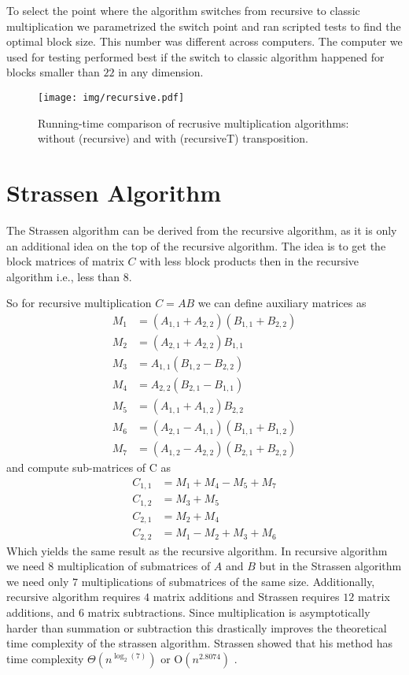 \documentclass[a4paper,11pt]{article}
\begin{document}
To select the point where the algorithm switches from recursive to classic multiplication we parametrized the switch point and ran scripted tests to find the optimal block size. This number was different across computers. The computer we used for testing performed best if the switch to classic algorithm happened for blocks smaller than $22$ in any dimension.

\begin{figure}[h]
\centering
\texttt{[image: img/recursive.pdf]}
\caption{Running-time comparison of recrusive multiplication algorithms: without (\textsf{recursive}) and with (\textsf{recursiveT}) transposition.}
\label{fig:recursive}
\end{figure}



\section{Strassen Algorithm}
\label{section:strassen}

The Strassen algorithm can be derived from the recursive algorithm, as it is only an additional idea on the top of the recursive algorithm.
The idea is to get the block matrices of matrix $C$ with less block products then in the recursive algorithm i.e., less than 8.

So for recursive multiplication $C=AB$ we can define auxiliary matrices as 
\begin{align*}
M_{1} &= (A_{1,1} + A_{2,2})(B_{1,1} + B_{2,2}) \\
M_{2} &= (A_{2,1} + A_{2,2})B_{1,1} \\
M_{3} &= A_{1,1}(B_{1,2} - B_{2,2}) \\
M_{4} &= A_{2,2}(B_{2,1} - B_{1,1}) \\
M_{5} &= (A_{1,1} + A_{1,2})B_{2,2} \\
M_{6} &= (A_{2,1} - A_{1,1})(B_{1,1} + B_{1,2}) \\
M_{7} &= (A_{1,2} - A_{2,2})(B_{2,1} + B_{2,2})
\end{align*}
and compute sub-matrices of C as
\begin{align*}
C_{1,1} &= M_{1} + M_{4} - M_{5} + M_{7} \\
C_{1,2} &= M_{3} + M_{5} \\
C_{2,1} &= M_{2} + M_{4} \\
C_{2,2} &= M_{1} - M_{2} + M_{3} + M_{6}
\end{align*}
Which yields the same result as the recursive algorithm.
In recursive algorithm we need $8$ multiplication of submatrices of $A$ and $B$ but in the Strassen algorithm we need only $7$ multiplications of submatrices of the same size. Additionally, recursive algorithm requires $4$ matrix additions and Strassen requires $12$ matrix additions, and $6$ matrix subtractions. Since multiplication is asymptotically harder than summation or subtraction this drastically improves the theoretical time complexity of the strassen algorithm. Strassen showed that his method has time complexity
$\Theta(n^{\log_{2}(7)})$ or $\textrm{O}(n^{2.8074})$ \cite{Pan1978a}. 
\end{document}
